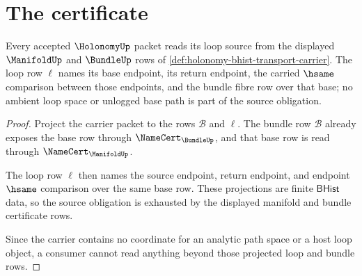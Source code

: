 \section{The certificate}
\label{sec:holonomy-certificate}

\begin{theorem}
\label{thm:holonomy-loop-source-obligation}
Every accepted $\HolonomyUp$ packet reads its loop source from the displayed $\ManifoldUp$ and $\BundleUp$ rows of \autoref{def:holonomy-bhist-transport-carrier}. The loop row $\ell$ names its base endpoint, its return endpoint, the carried $\hsame$ comparison between those endpoints, and the bundle fibre row over that base; no ambient loop space or unlogged base path is part of the source obligation.
\end{theorem}
\begin{proof}
Project the carrier packet to the rows $\mathcal B$ and $\ell$. The bundle row $\mathcal B$ already exposes the base row through $\NameCert_{\BundleUp}$, and that base row is read through $\NameCert_{\ManifoldUp}$.

The loop row $\ell$ then names the source endpoint, return endpoint, and endpoint $\hsame$ comparison over the same base row. These projections are finite $\mathsf{BHist}$ data, so the source obligation is exhausted by the displayed manifold and bundle certificate rows.

Since the carrier contains no coordinate for an analytic path space or a host loop object, a consumer cannot read anything beyond those projected loop and bundle rows.
\end{proof}

